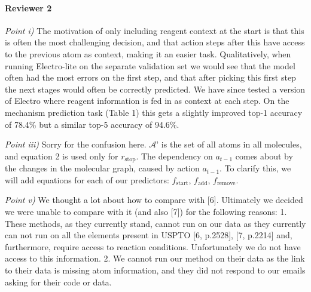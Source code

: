 \documentclass{article}
\begin{document}

\paragraph{Reviewer 2}
\emph{Point i)}
The motivation of only including reagent context at the start is that this is often the most challenging decision, and that action steps after this have access to the previous atom as context, making it an easier task.
Qualitatively, when running Electro-lite on the separate validation set we would see that the model often had the most errors on the first step, and that after picking this first step the next stages would often be correctly predicted.
We have since tested a version of Electro where reagent information is fed in as context at each step. 
On the mechanism prediction task (Table 1) this gets a slightly improved top-1 accuracy of 78.4\% but a similar top-5 accuracy of 94.6\%.


\emph{Point iii)} 
Sorry for the confusion here. $\mathcal{A}’$ is the set of all atoms in all molecules, and equation 2 is used only for $r_\textrm{stop}$.
The dependency on $a_{t-1}$ comes about by the changes in the molecular graph, caused by action $a_{t-1}$. 
To clarify this, we will add equations for each of our predictors: $f_\textrm{start}$, $f_\textrm{add}$, $f_\textrm{remove}$.

\emph{Point v)} 
We thought a lot about how to compare with [6]. Ultimately we decided we were unable to compare with it (and also [7]) for the following reasons: 1.
 These methods, as they currently stand, cannot run on our data as they currently can not run on all the elements present in USPTO [6, p.2528], [7, p.2214] and, furthermore, require access to reaction conditions. 
 Unfortunately we do not have access to this information. 2. We cannot run our method on their data as the link to their data is missing atom information, and they did not respond to our emails asking for their code or data. 
\end{document}
